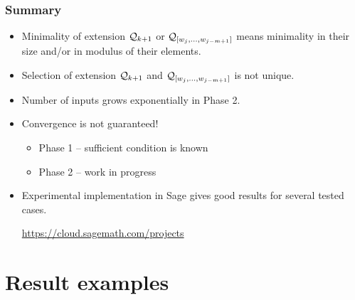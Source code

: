 \documentclass[11pt]{beamer}
\begin{document}
\begin{frame}
    \frametitle{Summary}    
    \begin{itemize}
        \item Minimality of extension $\mathcal{Q}_{k+1}$ or $\mathcal{Q}_{[w_j,\dots, w_{j-m+1}]}$ means minimality in their size and/or in modulus of their elements.
        \pause
        \item Selection of extension $\mathcal{Q}_{k+1}$ and $\mathcal{Q}_{[w_j,\dots, w_{j-m+1}]}$ is not unique.
        \pause
        \item Number of inputs grows exponentially in Phase 2.
        \pause
        \item Convergence is not guaranteed!
        \pause
        \begin{itemize}
            \item Phase 1 -- sufficient condition is known
            \item Phase 2 -- work in progress 
        \end{itemize}
        \pause
        \item Experimental implementation in Sage gives good results for several tested cases. 
        \rule{0cm}{0cm}
    
     \url{https://cloud.sagemath.com/projects}
    \end{itemize}
\end{frame}






\section{Result examples}
\end{document}
